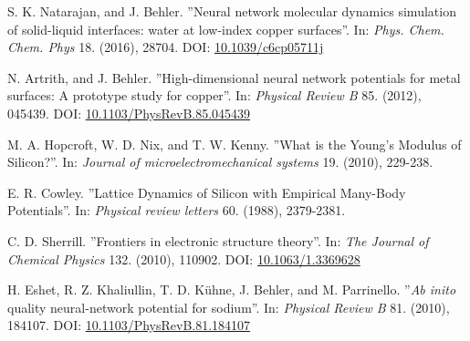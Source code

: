 \documentclass[twoside,english]{uiofysmaster}
\begin{document}
\begin{thebibliography}{56}
 S. K. Natarajan, and J. Behler. 
 ''Neural network molecular dynamics simulation of solid-liquid interfaces: water at low-index copper surfaces''. 
 In: \textit{Phys. Chem. Chem. Phys} 18. (2016), 28704. 
 DOI: \href{http://doi.org/10.1039/c6cp05711j}{10.1039/c6cp05711j}
 
 N. Artrith, and J. Behler. 
 ''High-dimensional neural network potentials for metal surfaces: A prototype study for copper''. 
 In: \textit{Physical Review B} 85. (2012), 045439. 
 DOI: \href{http://doi.org/10.1103/PhysRevB.85.045439}{10.1103/PhysRevB.85.045439}
 
 M. A. Hopcroft, W. D. Nix, and T. W. Kenny. 
 ''What is the Young's Modulus of Silicon?''.
 In: \textit{Journal of microelectromechanical systems} 19. (2010), 229-238. 
 
 E. R. Cowley. 
 ''Lattice Dynamics of Silicon with Empirical Many-Body Potentials''. 
 In: \textit{Physical review letters} 60. (1988), 2379-2381. 
 
 C. D. Sherrill. 
 ''Frontiers in electronic structure theory''. 
 In: \textit{The Journal of Chemical Physics} 132. (2010), 110902. 
 DOI: \href{http://dx.doi.org/10.1063/1.3369628}{10.1063/1.3369628}
 
 H. Eshet, R. Z. Khaliullin, T. D. Kühne, J. Behler, and M. Parrinello. 
 ''\textit{Ab inito} quality neural-network potential for sodium''. 
 In: \textit{Physical Review B} 81. (2010), 184107. 
 DOI: \href{http://dx.doi.org/10.1103/PhysRevB.81.184107}{10.1103/PhysRevB.81.184107}
 
 
 
\end{thebibliography}
\end{document}
